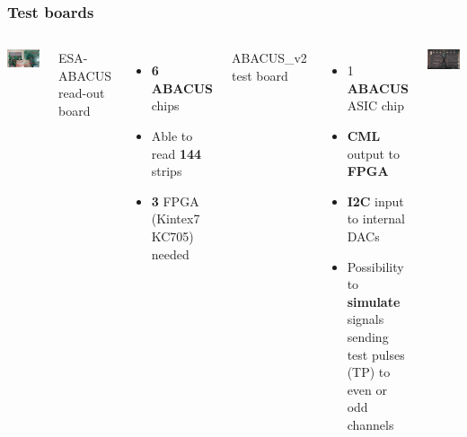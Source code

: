 \documentclass[aspectratio=169]{beamer}
\begin{document}
	\begin{frame}
	\frametitle{Test boards}
		\begin{columns}
			\begin{center}
				\includegraphics[width=0.99 \textwidth]{IMG/TestBoard.pdf}
			\end{center}
		{\hspace*{1.5cm}
		{\color{blue}ESA-ABACUS read-out board}
		\begin{itemize}
			\item \textbf{6 ABACUS} chips
			\item Able to read \textbf{144} strips
			\item \textbf{3} FPGA (Kintex7 KC705) needed
		\end{itemize}
			}
			\vspace*{1cm}
			\hspace*{1.5cm}
			{\color{blue}ABACUS\_v2 test board}
			\begin{itemize}
				\item 1 \textbf{ABACUS} ASIC chip
				\item \textbf{CML} output to \textbf{FPGA}
				\item \textbf{I2C} input to internal DACs
				\item Possibility to \textbf{simulate} signals sending test pulses (TP) to even or odd channels
			\end{itemize}
		\begin{center}
			\vspace*{0.5cm}
			\includegraphics[width=0.6 \textwidth]{IMG/EsaAbacus.png}
		\end{center}
	
		\end{columns}	
	\end{frame}
\end{document}
